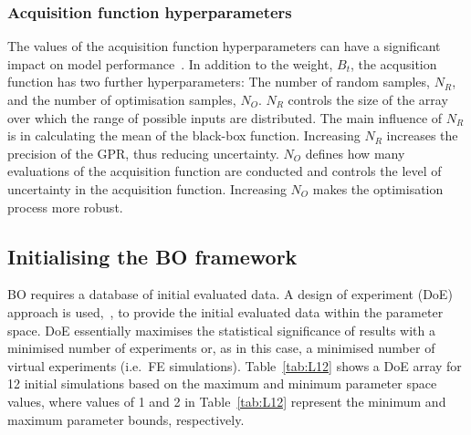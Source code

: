 \documentclass[preprint, review, 12pt]{elsarticle}
\begin{document}

	\subsubsection{Acquisition function hyperparameters}
	\label{h:acquisition_function_p}

	The values of the acquisition function hyperparameters can have a significant impact on model performance~\cite{GHAVAMIAN2021, SNOEK2012}.
	In addition to the weight, $B_t$, the acqusition function has two further hyperparameters: The number of random samples, $N_R$, and the number of optimisation samples, $N_O$.
	$N_R$ controls the size of the array over which the range of possible inputs are distributed.
	The main influence of $N_R$ is in calculating the mean of the black-box function.
	Increasing $N_R$ increases the precision of the GPR, thus reducing uncertainty.
	$N_O$ defines how many evaluations of the acquisition function are conducted and controls the level of uncertainty in the acquisition function.
	Increasing $N_O$ makes the optimisation process more robust.

	\subsection{Initialising the BO framework}
	\label{h:framework}

	BO requires a database of initial evaluated data.
	A design of experiment (DoE) approach is used,~\cite{UY2009, FRALEY2020}, to provide the initial evaluated data within the parameter space.
	DoE essentially maximises the statistical significance of results with a minimised number of experiments or, as in this case, a minimised number of virtual experiments (i.e.\ FE simulations).
	Table~\ref{tab:L12} shows a DoE array for 12 initial simulations based on the maximum and minimum parameter space values, where values of 1 and 2 in Table~\ref{tab:L12} represent the minimum and maximum parameter bounds, respectively.
\end{document}
